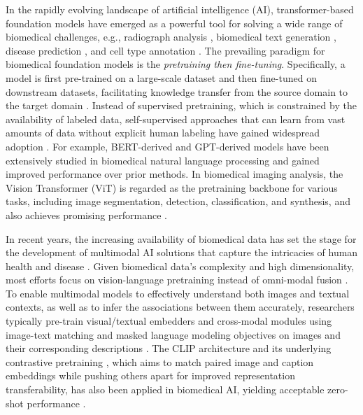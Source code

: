\documentclass[10pt]{article} \usepackage[preprint]{tmlr}
\begin{document}
In the rapidly evolving landscape of artificial intelligence (AI), transformer-based foundation models \citep{vaswani2017attention, dosovitskiy2020image, bommasani2021opportunities, zhou2023comprehensive} have emerged as a powerful tool for solving a wide range of biomedical challenges, e.g., radiograph analysis \citep{park2022self, zhou2022generalized}, biomedical text generation \citep{luo2022biogpt}, disease prediction \citep{rasmy2021med}, and cell type annotation \citep{yang2022scbert}. The prevailing paradigm for biomedical foundation models is the \textit{pretraining then fine-tuning}. Specifically, a model is first pre-trained on a large-scale dataset and then fine-tuned on downstream datasets, facilitating knowledge transfer from the source domain to the target domain \citep{niu2020decade}. Instead of supervised pretraining, which is constrained by the availability of labeled data, self-supervised approaches that can learn from vast amounts of data without explicit human labeling have gained widespread adoption \citep{balestriero2023cookbook, huang2023self, nadif2021unsupervised, krishnan2022self}. For example, BERT-derived \citep{devlin2018bert,rasmy2021med, lee2020biobert, gu2021domain, chakraborty2020biomedbert, alsentzer2019publicly} and GPT-derived \cite{radford2019language, luo2022biogpt, kraljevic2021medgpt} models have been extensively studied in biomedical natural language processing and gained improved performance over prior methods. In biomedical imaging analysis, the Vision Transformer (ViT) \citep{dosovitskiy2020image} is regarded as the pretraining backbone for various tasks, including image segmentation, detection, classification, and synthesis, and also achieves promising performance \citep{shamshad2023transformers, valanarasu2021medical, kong2021breaking, manzari2023medvit}. 

In recent years, the increasing availability of biomedical data has set the stage for the development of multimodal AI solutions that capture the intricacies of human health and disease \citep{acosta2022multimodal}. Given biomedical data's complexity and high dimensionality, most efforts focus on vision-language pretraining instead of omni-modal fusion \citep{selivanov2023medical, chambon2022adapting}. To enable multimodal models to effectively understand both images and textual contexts, as well as to infer the associations between them accurately, researchers typically pre-train visual/textual embedders and cross-modal modules using image-text matching and masked language modeling objectives on images and their corresponding descriptions \citep{kim2021vilt, li2020comparison, delbrouck2022vilmedic, yan2022clinical, khare2021mmbert, chen2022multi}. The CLIP architecture and its underlying contrastive pretraining \citep{radford2021learning, jia2021scaling}, which aims to match paired image and caption embeddings while pushing others apart for improved representation transferability, has also been applied in biomedical AI, yielding acceptable zero-shot performance \citep{zhang2022contrastive, huang2021gloria, wang-etal-2022-medclip, eslami2023pubmedclip, zhang2023large}.
\end{document}
